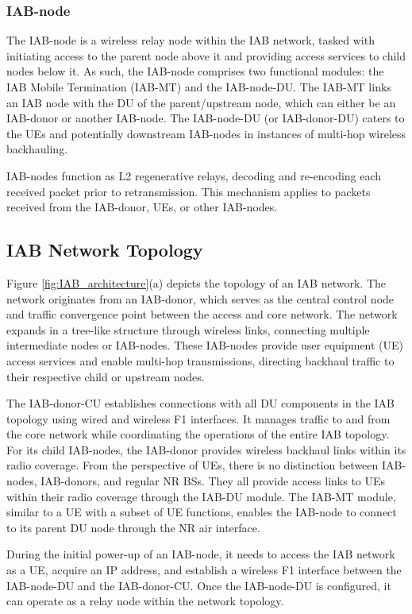 \documentclass[lettersize,journal]{IEEEtran}
\begin{document}
\subsubsection{IAB-node} The IAB-node is a wireless relay node within the IAB network, tasked with initiating access to the parent node above it and providing access services to child nodes below it. As such, the IAB-node comprises two functional modules: the IAB Mobile Termination (IAB-MT) and the IAB-node-DU. The IAB-MT links an IAB node with the DU of the parent/upstream node, which can either be an IAB-donor or another IAB-node. The IAB-node-DU (or IAB-donor-DU) caters to the UEs and potentially downstream IAB-nodes in instances of multi-hop wireless backhauling.

IAB-nodes function as L2 regenerative relays, decoding and re-encoding each received packet prior to retransmission. This mechanism applies to packets received from the IAB-donor, UEs, or other IAB-nodes.

\subsection{IAB Network Topology}

Figure \ref{fig:IAB_architecture}(a) depicts the topology of an IAB network. The network originates from an IAB-donor, which serves as the central control node and traffic convergence point between the access and core network. The network expands in a tree-like structure through wireless links, connecting multiple intermediate nodes or IAB-nodes. These IAB-nodes provide user equipment (UE) access services and enable multi-hop transmissions, directing backhaul traffic to their respective child or upstream nodes.

The IAB-donor-CU establishes connections with all DU components in the IAB topology using wired and wireless F1 interfaces. It manages traffic to and from the core network while coordinating the operations of the entire IAB topology. For its child IAB-nodes, the IAB-donor provides wireless backhaul links within its radio coverage. From the perspective of UEs, there is no distinction between IAB-nodes, IAB-donors, and regular NR BSs. They all provide access links to UEs within their radio coverage through the IAB-DU module. The IAB-MT module, similar to a UE with a subset of UE functions, enables the IAB-node to connect to its parent DU node through the NR air interface.

During the initial power-up of an IAB-node, it needs to access the IAB network as a UE, acquire an IP address, and establish a wireless F1 interface between the IAB-node-DU and the IAB-donor-CU. Once the IAB-node-DU is configured, it can operate as a relay node within the network topology.
\end{document}
